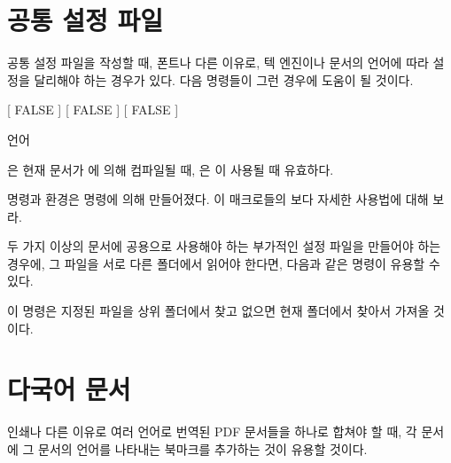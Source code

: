 \documentclass[minted]{hzguide}
\begin{document}
\section{공통 설정 파일}

공통 설정 파일을 작성할 때, 폰트나 다른 이유로, 텍 엔진이나 문서의 언어에 따라 설정을 달리해야 하는 경우가 있다. 
다음 명령들이 그런 경우에 도움이 될 것이다.

\begin{code}
[ FALSE ]
[ FALSE ]
[ FALSE ]
\begin{IfLanguage}{언어} \end{IfLanguage}
\end{code}

\macro{\IfXetex}은 현재 문서가 에 의해 컴파일될 때, \macro{\IfLuatex}은 이 사용될 때 유효하다.


\macro{\ifLang} 명령과  환경은 \macro{\NewConditionals} 명령에 의해 만들어졌다.
이 매크로들의 보다 자세한 사용법에 대해 \를 보라.

두 가지 이상의 문서에 공용으로 사용해야 하는 부가적인 설정 파일을 만들어야 하는 경우에, 그 파일을 서로 다른 폴더에서 읽어야 한다면, 다음과 같은 명령이 유용할 수 있다.

\begin{code}
\NewDocumentCommand {}
{
    { 
         
    }{
    }
}
\end{code}

이 명령은 지정된 파일을 상위 폴더에서 찾고 없으면 현재 폴더에서 찾아서 가져올 것이다.

\section{다국어 문서}

인쇄나 다른 이유로 여러 언어로 번역된 PDF 문서들을 하나로 합쳐야 할 때, 각 문서에 그 문서의 언어를 나타내는 북마크를 추가하는 것이 유용할 것이다.

\begin{code}
\NewDocumentCommand {}
{
}
\end{code}
\end{document}
